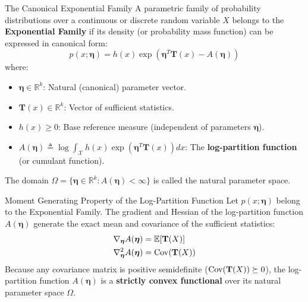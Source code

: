 \begin{definitionbox}{The Canonical Exponential Family}
A parametric family of probability distributions over a continuous or discrete random variable $X$ belongs to the \textbf{Exponential Family} if its density (or probability mass function) can be expressed in canonical form:
\begin{equation}
p(x; \boldsymbol{\eta}) = h(x) \exp\left( \boldsymbol{\eta}^T \mathbf{T}(x) - A(\boldsymbol{\eta}) \right)
\label{eq:exp_family_def}
\end{equation}
where:
\begin{itemize}
    \item $\boldsymbol{\eta} \in \mathbb{R}^k$: Natural (canonical) parameter vector.
    \item $\mathbf{T}(x) \in \mathbb{R}^k$: Vector of sufficient statistics.
    \item $h(x) \ge 0$: Base reference measure (independent of parameters $\boldsymbol{\eta}$).
    \item $A(\boldsymbol{\eta}) \triangleq \log \int_{\mathcal{X}} h(x) \exp\left( \boldsymbol{\eta}^T \mathbf{T}(x) \right) dx$: The \textbf{log-partition function} (or cumulant function).
\end{itemize}
The domain $\Omega = \{ \boldsymbol{\eta} \in \mathbb{R}^k : A(\boldsymbol{\eta}) < \infty \}$ is called the natural parameter space.
\end{definitionbox}

\begin{theorembox}{Moment Generating Property of the Log-Partition Function}
\label{thm:exp_moments}
Let $p(x; \boldsymbol{\eta})$ belong to the Exponential Family. The gradient and Hessian of the log-partition function $A(\boldsymbol{\eta})$ generate the exact mean and covariance of the sufficient statistics:
\begin{align}
\nabla_{\boldsymbol{\eta}} A(\boldsymbol{\eta}) &= \operatorname{\mathbb{E}}[\mathbf{T}(X)] \label{eq:exp_mean} \\
\nabla_{\boldsymbol{\eta}}^2 A(\boldsymbol{\eta}) &= \operatorname{Cov}(\mathbf{T}(X)) \label{eq:exp_cov}
\end{align}
Because any covariance matrix is positive semidefinite ($\operatorname{Cov}(\mathbf{T}(X)) \succeq 0$), the log-partition function $A(\boldsymbol{\eta})$ is a \textbf{strictly convex functional} over its natural parameter space $\Omega$.
\end{theorembox}

